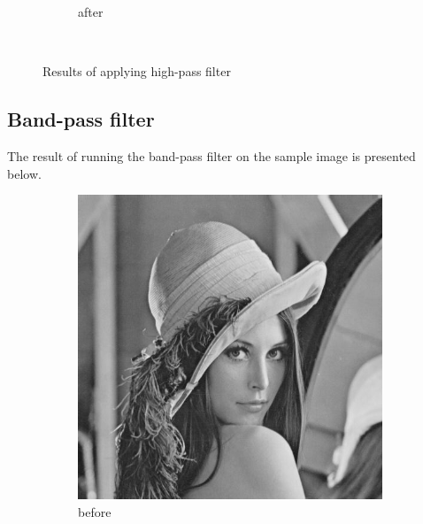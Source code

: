 \documentclass[12pt]{article}
\begin{document}
\begin{figure}[H]
\begin{subfigure}[t]{\subfiguresize}
        \caption{after}
    \end{subfigure}\\[1em]
    \caption{Results of applying high-pass filter}
\end{figure}  
\subsection{Band-pass filter}
The result of running the band-pass filter on the sample image is presented below.
\begin{figure}[H]\centering
    \begin{subfigure}[t]{\subfiguresize}\centering
        \includegraphics[width=\textwidth]{img/lena.png}
        \caption{before}
    \end{subfigure}
    \hspace{2em}
    \begin{subfigure}[t]{\subfiguresize}\centering

\end{subfigure}
\end{figure}
\end{document}
